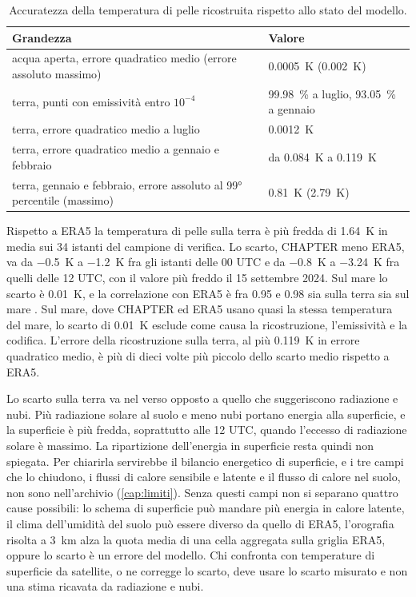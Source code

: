 \begin{table}[htbp]
  \centering
  \small
  \caption{Accuratezza della temperatura di pelle ricostruita rispetto allo stato del modello.}
  \label{tab:skt}
  \begin{tabularx}{\textwidth}{@{}Xl@{}}
    \toprule
    Grandezza & Valore \\
    \midrule
    acqua aperta, errore quadratico medio (errore assoluto massimo) & \SI{0.0005}{K} (\SI{0.002}{K}) \\
    terra, punti con emissività entro $10^{-4}$ & \SI{99.98}{\percent} a luglio, \SI{93.05}{\percent} a gennaio \\
    terra, errore quadratico medio a luglio & \SI{0.0012}{K} \\
    terra, errore quadratico medio a gennaio e febbraio & da \SI{0.084}{K} a \SI{0.119}{K} \\
    terra, gennaio e febbraio, errore assoluto al 99° percentile (massimo) & \SI{0.81}{K} (\SI{2.79}{K}) \\
    \bottomrule
  \end{tabularx}
\end{table}

Rispetto a ERA5 la temperatura di pelle sulla terra è più fredda di \SI{1.64}{K} in media sui 34
istanti del campione di verifica. Lo scarto, CHAPTER meno ERA5, va da \SI{-0.5}{K} a \SI{-1.2}{K}
fra gli istanti delle 00 UTC e da \SI{-0.8}{K} a \SI{-3.24}{K} fra quelli delle 12 UTC, con il
valore più freddo il 15 settembre 2024. Sul mare lo scarto è \SI{+0.01}{K}, e la correlazione con
ERA5 è fra \num{0.95} e \num{0.98} sia sulla terra sia sul mare \parencite{issue57}. Sul mare, dove
CHAPTER ed ERA5 usano quasi la stessa temperatura del mare, lo scarto di \SI{0.01}{K} esclude come
causa la ricostruzione, l'emissività e la codifica. L'errore della ricostruzione sulla terra, al più
\SI{0.119}{K} in errore quadratico medio, è più di dieci volte più piccolo dello scarto medio
rispetto a ERA5.

Lo scarto sulla terra va nel verso opposto a quello che suggeriscono radiazione e nubi. Più
radiazione solare al suolo e meno nubi portano energia alla superficie, e la superficie è più fredda,
soprattutto alle 12 UTC, quando l'eccesso di radiazione solare è massimo. La ripartizione
dell'energia in superficie resta quindi non spiegata. Per chiarirla servirebbe
il bilancio energetico di superficie, e i tre campi che lo chiudono, i flussi di calore sensibile e
latente e il flusso di calore nel suolo, non sono nell'archivio (\cref{cap:limiti}). Senza questi
campi non si separano quattro cause possibili: lo schema di superficie può mandare più energia in
calore latente, il clima dell'umidità del suolo può essere diverso da quello di ERA5, l'orografia
risolta a \SI{3}{km} alza la quota media di una cella aggregata sulla griglia ERA5, oppure lo scarto è
un errore del modello. Chi confronta  con temperature di superficie da satellite, o ne
corregge lo scarto, deve usare lo scarto misurato e non una stima ricavata da radiazione e nubi.


